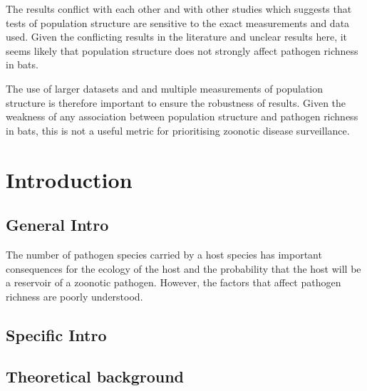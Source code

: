 The results conflict with each other and with other studies which suggests that tests of population structure are sensitive to the exact measurements and data used.
Given the conflicting results in the literature and unclear results here, it seems likely that population structure does not strongly affect pathogen richness in bats.


The use of larger datasets and and multiple measurements of population structure is therefore important to ensure the robustness of results.
Given the weakness of any association between population structure and pathogen richness in bats, this is not a useful metric for prioritising zoonotic disease surveillance.








\clearpage
\section{Introduction}

\subsection{General Intro}
The number of pathogen species carried by a host species has important consequences for the ecology of the host and the probability that the host will be a reservoir of a zoonotic pathogen.
However, the factors that affect pathogen richness are poorly understood.



\subsection{Specific Intro}



\subsection{Theoretical background}


